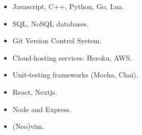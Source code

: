 \documentclass[12pt]{article}
\begin{document}
\begin{flushleft}
  \hrulefill {} \quad \hrulefill
  {\vspace{-1mm}}
  \begin{multicols}{2}
    \begin{itemize} \setlength\itemsep{-0.3em}\setlength\columnseprule{10pt}
      \item Javascript, C++, Python, Go, Lua.
      \item SQL, NoSQL databases.
      \item Git Version Control System.
      \item Cloud-hosting services: Heroku, AWS. 
      \item Unit-testing frameworks (Mocha, Chai).
      \item React, Nextjs.
      \item Node and Express.
      \item (Neo)vim.
    \end{itemize}  
  \end{multicols}
\end{flushleft} 

\vspace{-5mm}
\end{document}
